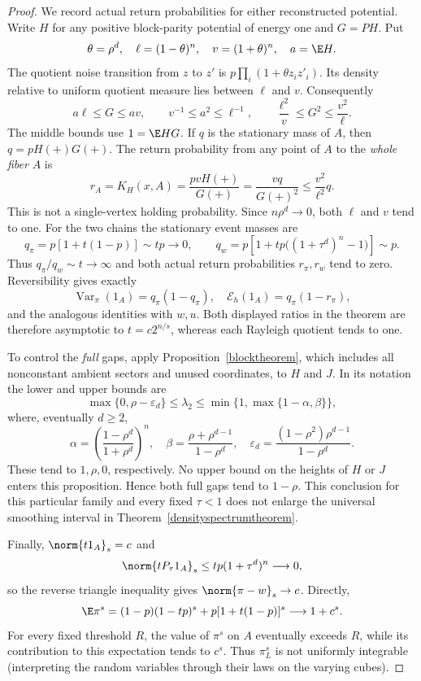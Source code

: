 \begin{proof}
We record actual return probabilities for either reconstructed potential.
Write $H$ for any positive block-parity potential of energy one and
$G=PH$. Put
\[
 \theta=\rho^d,\quad \ell=(1-\theta)^n,\quad v=(1+\theta)^n,
 \quad a=\E H.
\]
The quotient noise transition from $z$ to $z'$ is
$p\prod_i(1+\theta z_i z'_i)$. Its density relative to uniform
quotient measure lies between $\ell$ and $v$. Consequently
\[
 a\ell\leq G\leq av,\qquad
 v^{-1}\leq a^2\leq\ell^{-1},\qquad
 \frac{\ell^2}{v}\leq G^2\leq\frac{v^2}{\ell}.
\]
The middle bounds use $1=\E HG$. If $q$ is the stationary mass of
$A$, then $q=pH(+)G(+)$. The return probability from any point of
$A$ to the \emph{whole fiber} $A$ is
\[
 r_A=K_H(x,A)=\frac{pvH(+)}{G(+)}
              =\frac{vq}{G(+)^2}\leq\frac{v^2}{\ell^2}q.
\]
This is not a single-vertex holding probability. Since $n\rho^d\to0$,
both $\ell$ and $v$ tend to one. For the two chains the stationary
event masses are
\[
 q_\pi=p[1+t(1-p)]\sim tp\longrightarrow0,\qquad
 q_w=p\left[1+tp\big((1+\tau^d)^n-1\big)\right]\sim p.
\]
Thus $q_\pi/q_w\sim t\to\infty$ and both actual return
probabilities $r_\pi,r_w$ tend to zero. Reversibility gives exactly
\[
 \operatorname{Var}_{\pi}(1_A)=q_\pi(1-q_\pi),\quad
 \mathcal E_h(1_A)=q_\pi(1-r_\pi),
\]
and the analogous identities with $w,u$. Both displayed ratios in the
theorem are therefore asymptotic to $t=c2^{n/s}$, whereas each
Rayleigh quotient tends to one.

To control the \emph{full} gaps, apply Proposition~\ref{blocktheorem},
which includes all nonconstant ambient sectors and unused coordinates,
to $H$ and $J$. In its notation the lower and upper bounds are
\[
 \max\{0,\rho-\varepsilon_d\}\leq\lambda_2
 \leq\min\{1,\max\{1-\alpha,\beta\}\},
\]
where, eventually $d\geq2$,
\[
 \alpha=\left(\frac{1-\rho^d}{1+\rho^d}\right)^n,\quad
 \beta=\frac{\rho+\rho^{d-1}}{1-\rho^d},\quad
 \varepsilon_d=\frac{(1-\rho^2)\rho^{d-1}}{1-\rho^d}.
\]
These tend to $1,\rho,0$, respectively. No upper bound on the
heights of $H$ or $J$ enters this proposition. Hence both full gaps
tend to $1-\rho$. This conclusion for this particular family and
every fixed $\tau<1$ does not enlarge the universal smoothing
interval in Theorem~\ref{densityspectrumtheorem}.

Finally, $\norm{t1_A}_s=c$ and
\[
 \norm{tP_\tau1_A}_s\leq tp(1+\tau^d)^n\longrightarrow0,
\]
so the reverse triangle inequality gives $\norm{\pi-w}_s\to c$.
Directly,
\[
 \E\pi^s=(1-p)(1-tp)^s+p[1+t(1-p)]^s\longrightarrow1+c^s.
\]
For every fixed threshold $R$, the value of $\pi^s$ on $A$ eventually
exceeds $R$, while its contribution to this expectation tends to $c^s$.
Thus $\pi_L^s$ is not uniformly integrable (interpreting the random
variables through their laws on the varying cubes).
\end{proof}

